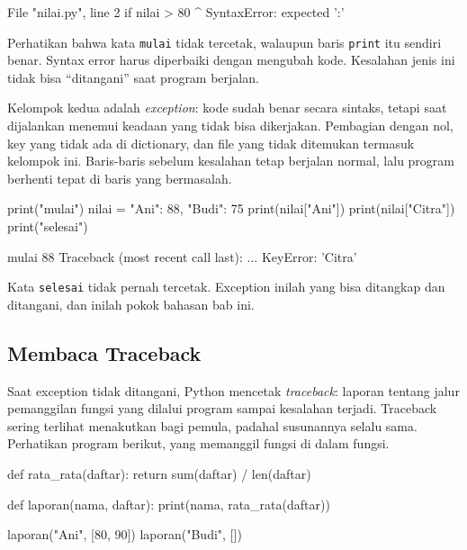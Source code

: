\begin{keluaran}
  File "nilai.py", line 2
    if nilai > 80
                 ^
SyntaxError: expected ':'
\end{keluaran}

Perhatikan bahwa kata \texttt{mulai} tidak tercetak, walaupun baris \texttt{print} itu sendiri benar. Syntax error harus diperbaiki dengan mengubah kode. Kesalahan jenis ini tidak bisa ``ditangani'' saat program berjalan.

Kelompok kedua adalah \emph{exception}: kode sudah benar secara sintaks, tetapi saat dijalankan menemui keadaan yang tidak bisa dikerjakan. Pembagian dengan nol, key yang tidak ada di dictionary, dan file yang tidak ditemukan termasuk kelompok ini. Baris-baris sebelum kesalahan tetap berjalan normal, lalu program berhenti tepat di baris yang bermasalah.

\begin{kode}
print("mulai")
nilai = {"Ani": 88, "Budi": 75}
print(nilai["Ani"])
print(nilai["Citra"])
print("selesai")
\end{kode}

\begin{keluaran}
mulai
88
Traceback (most recent call last):
  ...
KeyError: 'Citra'
\end{keluaran}

Kata \texttt{selesai} tidak pernah tercetak. Exception inilah yang bisa ditangkap dan ditangani, dan inilah pokok bahasan bab ini.

\subsection{Membaca Traceback}

Saat exception tidak ditangani, Python mencetak \emph{traceback}: laporan tentang jalur pemanggilan fungsi yang dilalui program sampai kesalahan terjadi. Traceback sering terlihat menakutkan bagi pemula, padahal susunannya selalu sama. Perhatikan program berikut, yang memanggil fungsi di dalam fungsi.

\begin{kode}[laporan.py]
def rata_rata(daftar):
    return sum(daftar) / len(daftar)

def laporan(nama, daftar):
    print(nama, rata_rata(daftar))

laporan("Ani", [80, 90])
laporan("Budi", [])
\end{kode}

